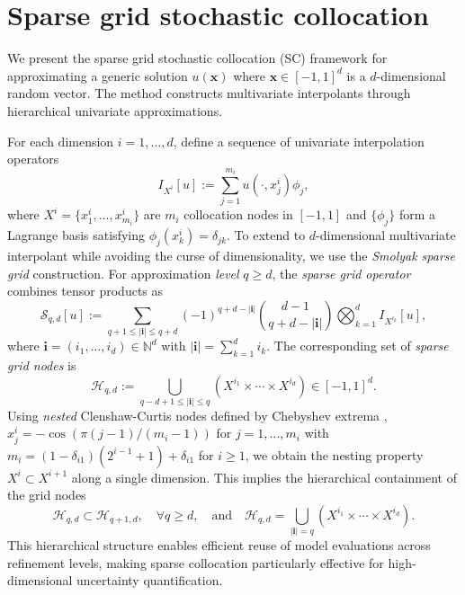 \section{Sparse grid stochastic collocation}\label{sec:SC}
We present the sparse grid stochastic collocation (SC) framework \cite{BaNoRi:2000, KlBa:2005, MaNi:2009, Sm:1963} for approximating a generic solution $u(\boldsymbol{x})$ where $\boldsymbol{x} \in [-1,1]^d$ is a $d$-dimensional random vector. The method constructs multivariate interpolants through hierarchical univariate approximations. 

For each dimension $i=1,\ldots,d$, define a sequence of univariate interpolation operators
%
\[
I_{X^{i}}[u]:=\sum_{j=1}^{m_{i}} u(\cdot, x_j^i)\phi_j,
\]
%
where $X^i = \{x_1^i,\ldots, x_{m_i}^i\}$ are $m_i$ collocation nodes in $[-1,1]$ and $\{\phi_j\}$ form a Lagrange basis satisfying $\phi_j(x_k^i) = \delta_{jk}$. To extend to $d$-dimensional multivariate interpolant while avoiding the curse of dimensionality, we use the {\it Smolyak sparse grid} construction. For approximation {\it level} $q \geq d$, the {\it sparse grid operator} combines tensor products as
%
\begin{equation}\label{eq: Smolyak_Quad_formula}
\mathcal{S}_{q,d}[u] := \sum_{q+1 \leq |\boldsymbol{i}| \leq q+d} (-1)^{q+d-|\boldsymbol{i}|} \binom{d-1}{q+d-|\boldsymbol{i}|} \bigotimes_{k=1}^d I_{X^{i_k}}[u],
\end{equation}
%
where $\boldsymbol{i} = (i_1,\ldots,i_d) \in \mathbb{N}^d$ with $|\boldsymbol{i}| = \sum_{k=1}^d i_k$. The corresponding set of {\it sparse grid nodes} is
%
\begin{equation}\label{eq:sparse_grid_nodes}
\mathcal{H}_{q,d} := \bigcup_{q-d+1 \leq |\boldsymbol{i}| \leq q} \left( X^{i_1} \times \cdots \times X^{i_d} \right)\in [-1,1]^d.
\end{equation}
%
Using \textit{nested} Clenshaw-Curtis nodes defined by Chebyshev extrema \cite{BaNoRi:2000, ClCu:1960}, $x_j^i = -\cos(\pi(j-1)/(m_i-1))$ for $j=1,\ldots,m_i$ with $m_i = (1-\delta_{i1})(2^{i-1}+1)+\delta_{i1}$ for $i\ge 1$, we obtain the nesting property $X^i \subset X^{i+1}$ along a single dimension. This implies the hierarchical containment of the grid nodes
%
\begin{equation}\label{eq:nested_grids}
\mathcal{H}_{q,d} \subset \mathcal{H}_{q+1,d}, \quad \forall q \geq d, \quad \text{and}\quad \mathcal{H}_{q,d} = \bigcup_{|\boldsymbol{i}|=q} \left(X^{i_1}\times \cdots\times X^{i_d}\right).
\end{equation}
%
This hierarchical structure enables efficient reuse of model evaluations across refinement levels, making sparse collocation particularly effective for high-dimensional uncertainty quantification.



